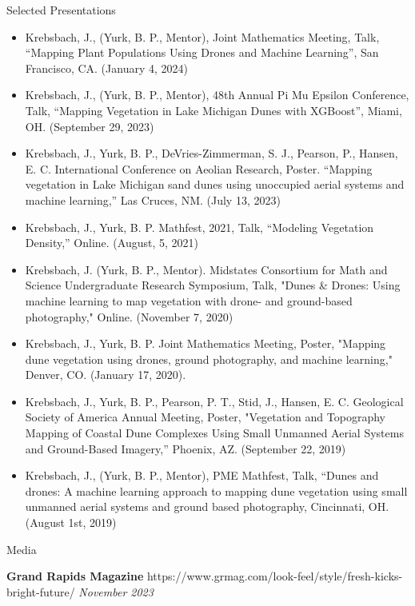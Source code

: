 \documentclass[
	11pt, %
]{resume} %
\begin{document}
\begin{rSection}{Selected Presentations}

  \begin{itemize}
      
\item Krebsbach, J., (Yurk, B. P., Mentor), Joint Mathematics Meeting, Talk, “Mapping Plant Populations Using Drones and Machine Learning”, San Francisco, CA. (January 4, 2024)
\item Krebsbach, J., (Yurk, B. P., Mentor), 48th Annual Pi Mu Epsilon Conference, Talk, “Mapping Vegetation in Lake Michigan Dunes with XGBoost”, Miami, OH. (September 29, 2023)

\item Krebsbach, J., Yurk, B. P., DeVries-Zimmerman, S. J., Pearson, P., Hansen, E. C. International Conference on Aeolian Research, Poster. “Mapping vegetation in Lake Michigan sand dunes using unoccupied aerial systems and machine learning,” Las Cruces, NM. (July 13, 2023)

\item Krebsbach, J., Yurk, B. P. Mathfest, 2021, Talk, “Modeling Vegetation Density,” Online. (August, 5, 2021)

\item Krebsbach, J. (Yurk, B. P., Mentor). Midstates Consortium for Math and Science Undergraduate Research Symposium, Talk, "Dunes \& Drones: Using machine learning to map vegetation with drone- and ground-based photography," Online. (November 7, 2020)

\item Krebsbach, J., Yurk, B. P. Joint Mathematics Meeting, Poster, "Mapping dune vegetation using drones, ground photography, and machine learning," Denver, CO. (January 17, 2020).


\item Krebsbach, J., Yurk, B. P., Pearson, P. T., Stid, J., Hansen, E. C. Geological Society of America Annual Meeting, Poster, "Vegetation and Topography Mapping of Coastal Dune Complexes Using Small Unmanned Aerial Systems and Ground-Based Imagery,” Phoenix, AZ. (September 22, 2019)


\item Krebsbach, J., (Yurk, B. P., Mentor), PME Mathfest, Talk, “Dunes and drones: A machine learning approach to mapping dune vegetation using small unmanned aerial systems and ground based photography, Cincinnati, OH. (August 1st, 2019)
  \end{itemize}

\end{rSection}


\begin{rSection}{Media}

  \textbf{Grand Rapids Magazine} https://www.grmag.com/look-feel/style/fresh-kicks-bright-future/ \hfill \textit{November 2023}
    
\end{rSection}


\end{document}
